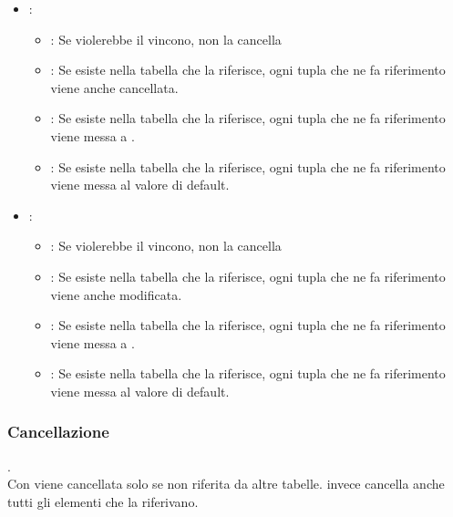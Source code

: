\begin{itemize}
    \item {}:
    \begin{itemize}
        \item {}: Se violerebbe il vincono, non la cancella
        \item {}: Se  esiste nella tabella che la riferisce, ogni tupla che ne fa riferimento viene anche cancellata.
        \item {}: Se  esiste nella tabella che la riferisce, ogni tupla che ne fa riferimento viene messa a .
        \item {}: Se  esiste nella tabella che la riferisce, ogni tupla che ne fa riferimento viene messa al valore di default.
    \end{itemize}
    \item {}:
    \begin{itemize}
        \item {}: Se violerebbe il vincono, non la cancella
        \item {}: Se  esiste nella tabella che la riferisce, ogni tupla che ne fa riferimento viene anche modificata.
        \item {}: Se  esiste nella tabella che la riferisce, ogni tupla che ne fa riferimento viene messa a .
        \item {}: Se  esiste nella tabella che la riferisce, ogni tupla che ne fa riferimento viene messa al valore di default.
    \end{itemize}
\end{itemize}

\subsubsection{Cancellazione}
.\\
Con  viene cancellata solo se non riferita da altre tabelle.  invece cancella anche tutti gli elementi che la riferivano.

